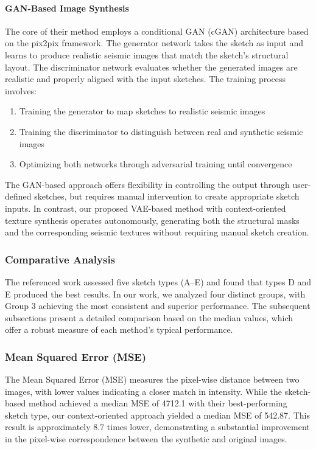 \documentclass{ieeeaccess}
\begin{document}
\paragraph{GAN-Based Image Synthesis} The core of their method employs a conditional GAN (cGAN) architecture based on the pix2pix framework. The generator network takes the sketch as input and learns to produce realistic seismic images that match the sketch's structural layout. The discriminator network evaluates whether the generated images are realistic and properly aligned with the input sketches. The training process involves:
\begin{enumerate}
    \item Training the generator to map sketches to realistic seismic images
    \item Training the discriminator to distinguish between real and synthetic seismic images
    \item Optimizing both networks through adversarial training until convergence
\end{enumerate}

The GAN-based approach offers flexibility in controlling the output through user-defined sketches, but requires manual intervention to create appropriate sketch inputs. In contrast, our proposed VAE-based method with context-oriented texture synthesis operates autonomously, generating both the structural masks and the corresponding seismic textures without requiring manual sketch creation.

\subsubsection{Comparative Analysis}

The referenced work assessed five sketch types (A--E) and found that types D and E produced the best results. In our work, we analyzed four distinct groups, with Group 3 achieving the most consistent and superior performance. The subsequent subsections present a detailed comparison based on the median values, which offer a robust measure of each method's typical performance.

\subsubsection{Mean Squared Error (MSE)}

The Mean Squared Error (MSE) measures the pixel-wise distance between two images, with lower values indicating a closer match in intensity. While the sketch-based method achieved a median MSE of 4712.1 with their best-performing sketch type, our context-oriented approach yielded a median MSE of 542.87. This result is approximately 8.7 times lower, demonstrating a substantial improvement in the pixel-wise correspondence between the synthetic and original images.
\end{document}
